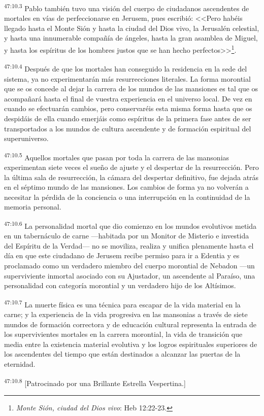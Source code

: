 \par
\textsuperscript{47:10.3} Pablo también tuvo una visión del cuerpo de ciudadanos ascendentes de mortales en vías de perfeccionarse en Jerusem, pues escribió: <<Pero habéis llegado hasta el Monte Sión y hasta la ciudad del Dios vivo, la Jerusalén celestial, y hasta una innumerable compañía de ángeles, hasta la gran asamblea de Miguel, y hasta los espíritus de los hombres justos que se han hecho perfectos>>\footnote{\textit{Monte Sión, ciudad del Dios vivo}: Heb 12:22-23.}.

\par
\textsuperscript{47:10.4} Después de que los mortales han conseguido la residencia en la sede del sistema, ya no experimentarán más resurrecciones literales. La forma morontial que se os concede al dejar la carrera de los mundos de las mansiones es tal que os acompañará hasta el final de vuestra experiencia en el universo local. De vez en cuando se efectuarán cambios, pero conservaréis esta misma forma hasta que os despidáis de ella cuando emerjáis como espíritus de la primera fase antes de ser transportados a los mundos de cultura ascendente y de formación espiritual del superuniverso.

\par
\textsuperscript{47:10.5} Aquellos mortales que pasan por toda la carrera de las mansonias experimentan siete veces el sueño de ajuste y el despertar de la resurrección. Pero la última sala de resurrección, la cámara del despertar definitivo, fue dejada atrás en el séptimo mundo de las mansiones. Los cambios de forma ya no volverán a necesitar la pérdida de la conciencia o una interrupción en la continuidad de la memoria personal.

\par
\textsuperscript{47:10.6} La personalidad mortal que dio comienzo en los mundos evolutivos metida en un tabernáculo de carne ---habitada por un Monitor de Misterio e investida del Espíritu de la Verdad--- no se moviliza, realiza y unifica plenamente hasta el día en que este ciudadano de Jerusem recibe permiso para ir a Edentia y es proclamado como un verdadero miembro del cuerpo morontial de Nebadon ---un superviviente inmortal asociado con su Ajustador, un ascendente al Paraíso, una personalidad con categoría morontial y un verdadero hijo de los Altísimos.

\par
\textsuperscript{47:10.7} La muerte física es una técnica para escapar de la vida material en la carne; y la experiencia de la vida progresiva en las mansonias a través de siete mundos de formación correctora y de educación cultural representa la entrada de los supervivientes mortales en la carrera morontial, la vida de transición que media entre la existencia material evolutiva y los logros espirituales superiores de los ascendentes del tiempo que están destinados a alcanzar las puertas de la eternidad.

\par
\textsuperscript{47:10.8} [Patrocinado por una Brillante Estrella Vespertina.]